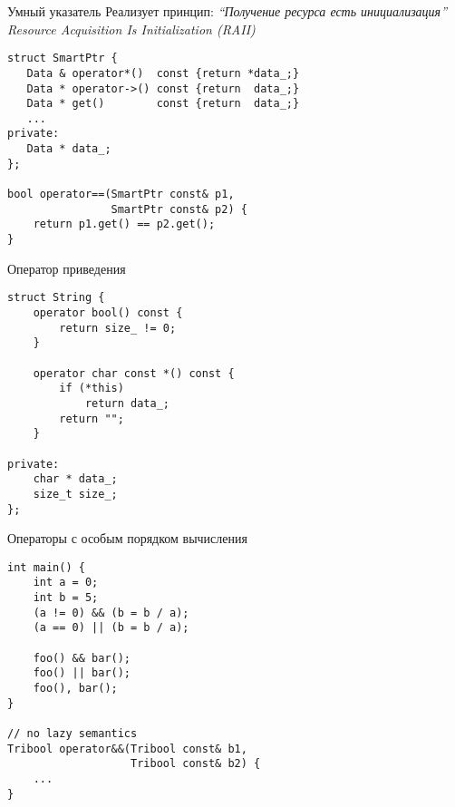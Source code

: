 \documentclass{beamer}
\begin{document}
\begin{frame}[fragile]{Умный указатель}
Реализует принцип: {\em ``Получение ресурса есть инициализация''
Resource Acquisition Is Initialization (RAII)}
\begin{lstlisting}
struct SmartPtr {
   Data & operator*()  const {return *data_;}
   Data * operator->() const {return  data_;}
   Data * get()        const {return  data_;}
   ... 
private:
   Data * data_;
};

bool operator==(SmartPtr const& p1,
                SmartPtr const& p2) {
    return p1.get() == p2.get();
}
    \end{lstlisting}
\end{frame}

\begin{frame}[fragile]{Оператор приведения}
    \begin{lstlisting}
struct String {
    operator bool() const {
        return size_ != 0;
    }

    operator char const *() const {
        if (*this)
            return data_;
        return "";
    }

private:
    char * data_;
    size_t size_;
};
    \end{lstlisting}
\end{frame}

\begin{frame}[fragile]{Операторы с особым порядком вычисления}
    \begin{lstlisting}
int main() {
    int a = 0;
    int b = 5;
    (a != 0) && (b = b / a);
    (a == 0) || (b = b / a);

    foo() && bar();
    foo() || bar();
    foo(), bar();
}

// no lazy semantics
Tribool operator&&(Tribool const& b1, 
                   Tribool const& b2) { 
    ... 
}
    \end{lstlisting}
\end{frame}
\end{document}
